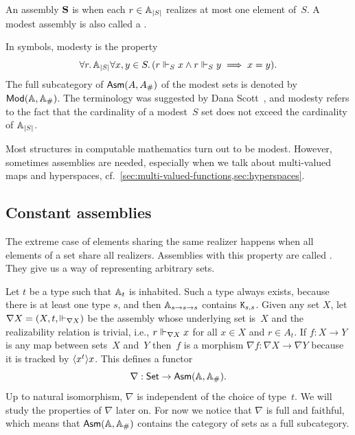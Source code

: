 \begin{definition}
  An assembly $\mathbf{S}$ is  when each $r \in \mathbb{A}_{|S|}$
  realizes at most one element of~$S$. A modest assembly is also
  called a .
\end{definition}

\noindent
In symbols, modesty is the property
%
\begin{equation*}
  \forall r .\,{\mathbb{A}_{|S|}}{
    \forall x,y \in S .\,
      (r \Vdash_S x \land r \Vdash_S y \implies x = y)
  }.
\end{equation*}
%
The full subcategory of $\mathsf{Asm}(A,A_{\#})$ of the modest sets is
denoted by~$\mathsf{Mod}(\mathbb{A}, \mathbb{A}_{\#})$. The terminology was suggested by Dana
Scott~, and modesty refers to the fact that
the cardinality of a modest~$S$ set does not exceed the cardinality of
$\mathbb{A}_{|S|}$.

Most structures in computable mathematics turn out to be modest.
However, sometimes assemblies are needed, especially when we talk
about multi-valued maps and hyperspaces,
cf.\ \cref{sec:multi-valued-functions,sec:hyperspaces}.


\subsection{Constant assemblies}
\label{sec:nabla}

The extreme case of elements sharing the same realizer happens when
all elements of a set share all realizers. Assemblies with this
property are called . They give us a way of
representing arbitrary sets.

Let $t$ be a type such that $\mathbb{A}_{t}$ is inhabited. Such a type
always exists, because there is at least one type $s$, and then
$\mathbb{A}_{s \to s \to s}$ contains $\mathtt{K}_{s,s}$. Given any set $X$, let
$\nabla X = (X, t, {\Vdash_{\nabla X}})$ be the assembly whose underlying
set is~$X$ and the realizability relation is trivial, i.e., $r
\Vdash_{\nabla X} x$ for all $x \in X$ and $r \in A_t$. If $f : X \to Y$
is any map between sets~$X$ and~$Y$ then~$f$ is a morphism $\nabla f :
\nabla X \to \nabla Y$ because it is tracked by
$\langle x^{t} \rangle{x}$. This defines a functor
%
\begin{equation*}
  \nabla : \mathsf{Set} \to \mathsf{Asm}(\mathbb{A},\mathbb{A}_{\#}).
\end{equation*}
%
Up to natural isomorphism, $\nabla$ is independent of the choice of
type~$t$. We will study the properties of $\nabla$ later on. For now
we notice that $\nabla$ is full and faithful, which means that
$\mathsf{Asm}(\mathbb{A},\mathbb{A}_{\#})$ contains the category of sets as a full
subcategory.

